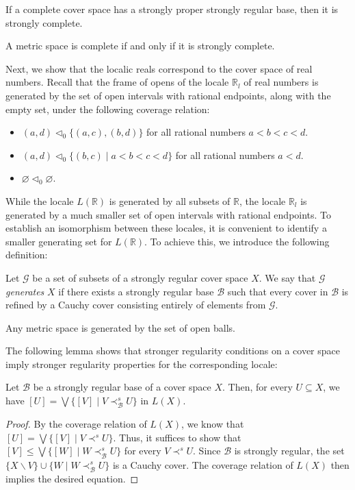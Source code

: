 \documentclass[pdflatex,sn-mathphys-num]{sn-jnl}
\theoremstyle{definition}
\theoremstyle{remark}
\numberwithin{figure}{section}
\newcommand{\rb}{\prec}
\begin{document}
\begin{cor}
If a complete cover space has a strongly proper strongly regular base, then it is strongly complete.
\end{cor}

\begin{cor}
A metric space is complete if and only if it is strongly complete.
\end{cor}

Next, we show that the localic reals correspond to the cover space of real numbers.
Recall that the frame of opens of the locale $\mathbb{R}_l$ of real numbers is generated by the set of open intervals with rational endpoints, along with the empty set, under the following coverage relation:
\begin{itemize}
\item $(a,d) \triangleleft_0 \{ (a,c), (b,d) \}$ for all rational numbers $a < b < c < d$.
\item $(a,d) \triangleleft_0 \{ (b,c) \mid a < b < c < d \}$ for all rational numbers $a < d$.
\item $\varnothing \triangleleft_0 \varnothing$.
\end{itemize}

While the locale $L(\mathbb{R})$ is generated by all subsets of $\mathbb{R}$, the locale $\mathbb{R}_l$ is generated by a much smaller set of open intervals with rational endpoints.
To establish an isomorphism between these locales, it is convenient to identify a smaller generating set for $L(\mathbb{R})$.
To achieve this, we introduce the following definition:

\begin{defn}
Let $\mathcal{G}$ be a set of subsets of a strongly regular cover space $X$.
We say that $\mathcal{G}$ \emph{generates} $X$ if there exists a strongly regular base $\mathcal{B}$ such that every cover in $\mathcal{B}$ is refined by a Cauchy cover consisting entirely of elements from $\mathcal{G}$.
\end{defn}

\begin{example}
Any metric space is generated by the set of open balls.
\end{example}

The following lemma shows that stronger regularity conditions on a cover space imply stronger regularity properties for the corresponding locale:

\begin{lem}
Let $\mathcal{B}$ be a strongly regular base of a cover space $X$.
Then, for every $U \subseteq X$, we have $[U] = \bigvee \{ [V] \mid V \rb^s_\mathcal{B} U \}$ in $L(X)$.
\end{lem}
\begin{proof}
By the coverage relation of $L(X)$, we know that $[U] = \bigvee \{ [V] \mid V \rb^s U \}$.
Thus, it suffices to show that $[V] \leq \bigvee \{ [W] \mid W \rb^s_\mathcal{B} U \}$ for every $V \rb^s U$.
Since $\mathcal{B}$ is strongly regular, the set $\{ X \backslash V \} \cup \{ W \mid W \rb^s_\mathcal{B} U \}$ is a Cauchy cover.
The coverage relation of $L(X)$ then implies the desired equation.
\end{proof}
\end{document}
